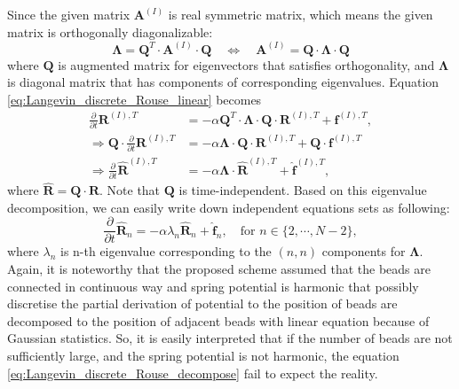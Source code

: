 \documentclass[10pt, a4paper]{article}
\begin{document}
Since the given matrix $\mathbf{A}^{(I)}$ is real symmetric matrix, which means the given matrix is orthogonally diagonalizable:
\begin{equation}
\boldsymbol{\Lambda} = \mathbf{Q}^{T}\cdot\mathbf{A}^{(I)}\cdot\mathbf{Q}\quad\Leftrightarrow\quad\mathbf{A}^{(I)}=\mathbf{Q}\cdot\boldsymbol{\Lambda}\cdot\mathbf{Q}
\end{equation}
where $\mathbf{Q}$ is augmented matrix for eigenvectors that satisfies orthogonality, and $\boldsymbol{\Lambda}$ is diagonal matrix that has components of corresponding eigenvalues. 
Equation \eqref{eq:Langevin_discrete_Rouse_linear} becomes
\begin{align}
\frac{\partial}{\partial t}\mathbf{R}^{(I),T} &= -\alpha\mathbf{Q}^{T}\cdot\boldsymbol{\Lambda}\cdot\mathbf{Q}\cdot\mathbf{R}^{(I),T} + \mathbf{f}^{(I),T}, \\
\Rightarrow \mathbf{Q}\cdot\frac{\partial}{\partial t}\mathbf{R}^{(I),T} &= -\alpha\boldsymbol{\Lambda}\cdot\mathbf{Q}\cdot\mathbf{R}^{(I),T} + \mathbf{Q}\cdot\mathbf{f}^{(I),T} \\
\Rightarrow \frac{\partial}{\partial t}\hat{\mathbf{R}}^{(I),T} &= - \alpha \boldsymbol{\Lambda}\cdot\hat{\mathbf{R}}^{(I),T} + \hat{\mathbf{f}}^{(I),T},
\end{align}
where $\hat{\mathbf{R}}=\mathbf{Q}\cdot\mathbf{R}$. Note that $\mathbf{Q}$ is time-independent.
Based on this eigenvalue decomposition, we can easily write down independent equations sets as following:
\begin{equation}
  \frac{\partial}{\partial t}\hat{\mathbf{R}}_n = -\alpha \lambda_n\hat{\mathbf{R}}_n + \hat{\mathbf{f}}_n,\quad\textrm{for }n\in\{2,\cdots, N-2\},
  \label{eq:Langevin_discrete_Rouse_decompose}
\end{equation}
where $\lambda_n$ is n-th eigenvalue corresponding to the $(n,n)$ components for $\boldsymbol{\Lambda}$.
Again, it is noteworthy that the proposed scheme assumed that the beads are connected in continuous way and spring potential is harmonic that possibly discretise the partial derivation of potential to the position of beads are decomposed to the position of adjacent beads with linear equation because of Gaussian statistics.
So, it is easily interpreted that if the number of beads are not sufficiently large, and the spring potential is not harmonic, the equation \eqref{eq:Langevin_discrete_Rouse_decompose} fail to expect the reality.
\end{document}
